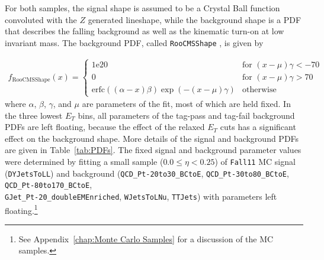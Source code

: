 \documentclass[dissertation.tex]{subfiles}
\begin{document}
For both samples, the signal shape is assumed to be a Crystal Ball function \cite{Crystal_Ball} convoluted with the $Z$ generated lineshape, while the background shape is a PDF that describes the falling background as well as the kinematic turn-on at low invariant mass.  The background PDF, called \verb+RooCMSShape+ \cite{tag_and_probe_method_AN}, is given by

\begin{eqnarray}
\label{eq:RooCMSShape}
f_{\mathrm{RooCMSShape}}(x) = \begin{cases} \mbox{1e20} & \mbox{for }(x - \mu)\gamma < -70 \\
\mbox{0} & \mbox{for }(x - \mu)\gamma > 70 \\
\mbox{erfc}((\alpha - x)\beta)\exp{(-(x - \mu)\gamma)} & \mbox{otherwise} \end{cases}
\end{eqnarray}
%
where $\alpha$, $\beta$, $\gamma$, and $\mu$ are parameters of the fit, most of which are held fixed.  In the three lowest $E_{T}$ bins, all parameters of the tag-pass and tag-fail background PDFs are left floating, because the effect of the relaxed $E_{T}$ cuts has a significant effect on the background shape.  More details of the signal and background PDFs are given in Table~\ref{tab:PDFs}.  The fixed signal and background parameter values were determined by fitting a small sample ($0.0 \leq \eta < 0.25$) of \verb+Fall11+ MC signal (\verb+DYJetsToLL+) and background (\verb+QCD_Pt-20to30_BCtoE+, \verb+QCD_Pt-30to80_BCtoE+, \verb+QCD_Pt-80to170_BCtoE+, \\\verb+GJet_Pt-20_doubleEMEnriched+, \verb+WJetsToLNu+, \verb+TTJets+) with parameters left floating.\footnote{See Appendix~\ref{chap:Monte Carlo Samples} for a discussion of the MC samples.}
\end{document}
